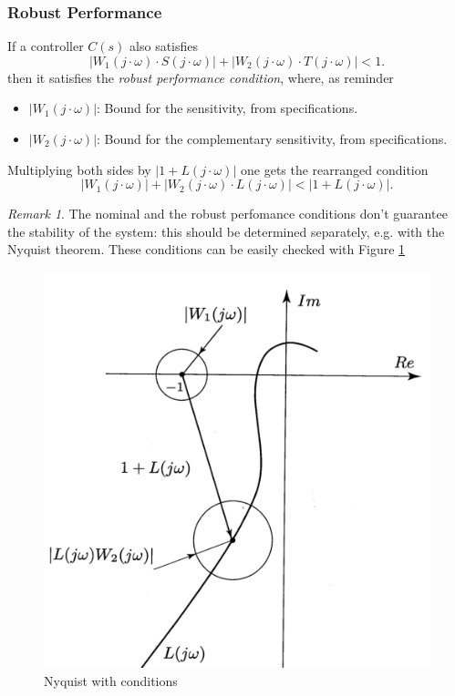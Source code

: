 \documentclass[a4paper,12 pt]{article}
\numberwithin{equation}{section}
\theoremstyle{definition}
\theoremstyle{remark}
\newtheorem*{bmk}{Remark}
\theoremstyle{definition}
\theoremstyle{definition}
\theoremstyle{definition}
\theoremstyle{remark}
\begin{document}
\subsubsection{Robust Performance}
If a controller $C(s)$ also satisfies
\begin{equation}
|W_1(j\cdot \omega) \cdot S(j\cdot \omega)|+|W_2(j\cdot \omega) \cdot T(j\cdot \omega)|<1.
\end{equation}
then it satisfies the \textit{robust performance condition}, where, as reminder
\begin{itemize}
\item $|W_1(j\cdot \omega)|$: Bound for the sensitivity, from specifications.
\item $|W_2(j\cdot \omega)|$: Bound for the complementary sensitivity, from specifications.
\end{itemize}


Multiplying both sides by $|1+L(j\cdot \omega)|$ one gets the rearranged condition
\begin{equation}
|W_1(j\cdot \omega)| +|W_2(j\cdot \omega) \cdot L(j\cdot \omega)|<|1+L(j\cdot \omega)|.
\end{equation}

\begin{bmk}
The nominal and the robust perfomance conditions don't guarantee the stability of the system: this should be determined separately, e.g. with the Nyquist theorem.
These conditions can be easily checked with Figure \ref{fig:rob}
\end{bmk}
\begin{figure}[H]
\begin{center}
\includegraphics[width=0.7\columnwidth]{robust2.png}
\caption{Nyquist with conditions}
\label{fig:rob}
\end{center}
\end{figure}
\end{document}
